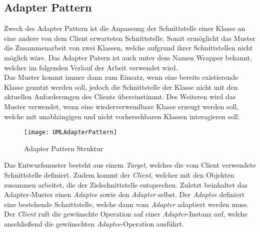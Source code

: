 \subsection{Adapter Pattern}\label{sec:AdapterPattern}
Zweck des Adapter Pattern ist die Anpassung der Schnittstelle einer Klasse an eine andere von dem Client erwarteten Schnittstelle. Somit ermöglicht das Muster die Zusammenarbeit von zwei Klassen, welche aufgrund ihrer Schnittstellen nicht möglich wäre. Das Adapter Patern ist auch unter dem Namen Wrapper bekannt, welcher im folgenden Verlauf der Arbeit verwendet wird.\cite[S.139]{DesignPatterns}\\
Das Muster kommt immer dann zum Einsatz, wenn eine bereits existierende Klasse genutzt werden soll, jedoch die Schnittstelle der Klasse nicht mit den aktuellen Anforderungen des Clients übereinstimmt. Des Weiteren wird das Muster verwendet, wenn eine wiederverwendbare Klasse erzeugt werden soll, welche mit unabhängigen und nicht vorhersehbaren Klassen interagieren soll.\cite[S.140 ff]{DesignPatterns}\\
\vspace{-0.5cm}
\begin{center}
    \begin{figure}[h]
     \centering
     \texttt{[image: UMLAdapterPattern]}
     \caption{Adapter Pattern Struktur \cite{DesignPatterns}}
    \label{fig:AdapterPattern}
    \end{figure}
\end{center}
\vspace{-2cm}
Das Entwurfsmuster besteht aus einem \textit{Target}, welches die vom Client verwendete Schnittstelle definiert. Zudem kommt der \textit{Client}, welcher mit den Objekten zusammen arbeitet, die der Zielschnittstelle entsprechen. Zuletzt beinhaltet das Adapter-Muster einen \textit{Adaptee} sowie den \textit{Adapter} selbst. Der \textit{Adaptee} definiert eine bestehende Schnittstelle, welche dann vom \textit{Adapter} adaptiert werden muss.\\ 
Der \textit{Client} ruft die gewünschte Operation auf einer \textit{Adapter}-Instanz auf, welche anschließend die gewünschten \textit{Adaptee}-Operation ausführt.\cite[S.140 ff]{DesignPatterns}

